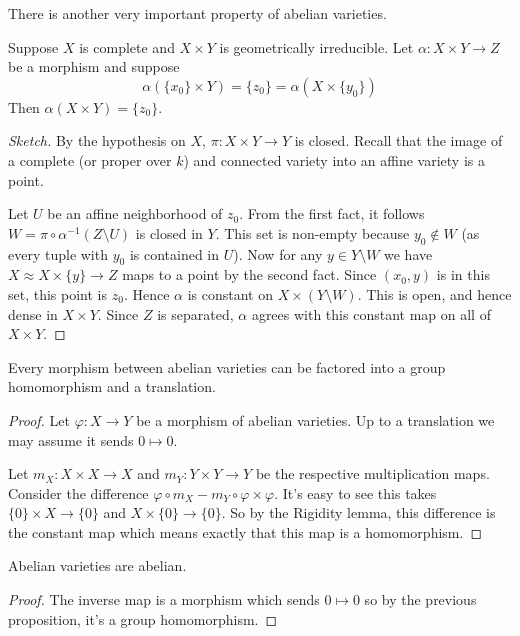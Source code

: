\documentclass[11pt]{article}
\begin{document}
There is another very important property of abelian varieties.

\begin{lem}
	Suppose $X$ is complete and $X\times Y$ is geometrically irreducible. Let $\alpha:X\times Y \to Z$ be a morphism and suppose
	$$
	\alpha(\{x_0\}\times Y) = \{z_0\} = \alpha(X\times\{y_0\})
	$$
	Then $\alpha(X\times Y) = \{z_0\}$.
\end{lem}
\begin{proof}[Sketch]
	By the hypothesis on $X$, $\pi:X\times Y \to Y$ is closed. Recall that the image of a complete (or proper over $k$) and connected variety into an affine variety is a point.
	
	Let $U$ be an affine neighborhood of $z_0$. From the first fact, it follows $W = \pi\circ\alpha^{-1}(Z\setminus U)$ is closed in $Y$. This set is non-empty because $y_0\notin W$ (as every tuple with $y_0$ is contained in $U$). Now for any $y\in Y\setminus W$ we have $X\approx X\times\{y\} \to Z$ maps to a point by the second fact. Since $(x_0,y)$ is in this set, this point is $z_0$. Hence $\alpha$ is constant on $X\times(Y\setminus W)$. This is open, and hence dense in $X\times Y$. Since $Z$ is separated, $\alpha$ agrees with this constant map on all of $X\times Y$.
\end{proof}

\begin{prop}
	Every morphism between abelian varieties can be factored into a group homomorphism and a translation.
\end{prop}
\begin{proof}
	Let $\varphi:X \to Y$ be a morphism of abelian varieties. Up to a translation we may assume it sends $0\mapsto 0$.
	
	Let $m_X:X\times X \to X$ and $m_Y:Y\times Y\to Y$ be the respective multiplication maps. Consider the difference $\varphi\circ m_X - m_Y\circ\varphi\times\varphi$. It's easy to see this takes $\{0\}\times X \to \{0\}$ and $X\times\{0\} \to \{0\}$. So by the Rigidity lemma, this difference is the constant map which means exactly that this map is a homomorphism.
\end{proof}

\begin{prop}
	Abelian varieties are abelian. 
\end{prop}
\begin{proof}
	The inverse map is a morphism which sends $0\mapsto 0$ so by the previous proposition, it's a group homomorphism.
\end{proof}
\end{document}
